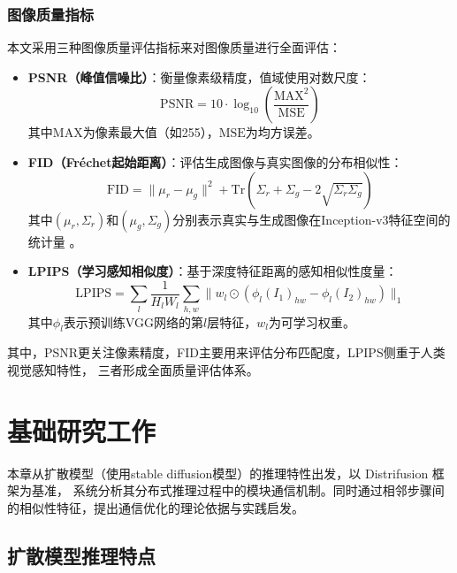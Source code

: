 \subsubsection{图像质量指标}
\label{sec:image-quality-metric}
\par
本文采用三种图像质量评估指标来对图像质量进行全面评估：
\begin{itemize}
    \item \textbf{PSNR（峰值信噪比）}：衡量像素级精度，值域使用对数尺度\cite{ceshizhibiao}：
    \begin{equation}
        \text{PSNR} = 10 \cdot \log_{10}\left(\frac{\text{MAX}^2}{\text{MSE}}\right)
    \end{equation}
    其中$\text{MAX}$为像素最大值（如255），$\text{MSE}$为均方误差\cite{Wang2019SpatialAS}。
    
    \item \textbf{FID（Fréchet起始距离）}：评估生成图像与真实图像的分布相似性\cite{ceshizhibiao}：
    \begin{equation}
        \text{FID} = \|\mu_r - \mu_g\|^2 + \text{Tr}(\Sigma_r + \Sigma_g - 2\sqrt{\Sigma_r\Sigma_g})
    \end{equation}
    其中$(\mu_r, \Sigma_r)$和$(\mu_g, \Sigma_g)$分别表示真实与生成图像在Inception-v3特征空间的统计量
    \cite{Heusel2017GANsTB}。
    
    \item \textbf{LPIPS（学习感知相似度）}：基于深度特征距离的感知相似性度量\cite{ceshizhibiao}：
    \begin{equation}
        \text{LPIPS} = \sum_{l} \frac{1}{H_lW_l} \sum_{h,w} \|w_l \odot (\phi_l(I_1)_{hw} - \phi_l(I_2)_{hw})\|_1
    \end{equation}
    其中$\phi_l$表示预训练VGG网络的第$l$层特征，$w_l$为可学习权重\cite{Zhang2018TheUE}。
\end{itemize}
\par
其中，PSNR更关注像素精度，FID主要用来评估分布匹配度，LPIPS侧重于人类视觉感知特性，
三者形成全面质量评估体系。 

\section{基础研究工作}
本章从扩散模型（使用stable diffusion模型）的推理特性出发，以 Distrifusion 框架为基准，
系统分析其分布式推理过程中的模块通信机制。同时通过相邻步骤间的相似性特征，提出通信优化的理论依据与实践启发。
\subsection{扩散模型推理特点}
